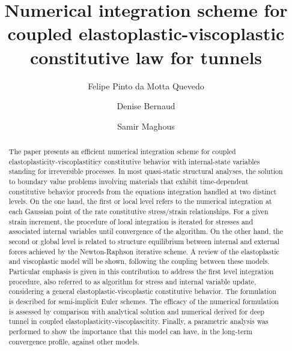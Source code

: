 \documentclass[Journal,letterpaper]{ascelike-new}
\begin{document}
\title{Numerical integration scheme for coupled elastoplastic-viscoplastic constitutive law for tunnels}

\author[1]{Felipe Pinto da Motta Quevedo}
\author[2]{Denise Bernaud}
\author[3]{Samir Maghous}


\maketitle

\begin{abstract}
The paper presents an efficient numerical integration scheme for coupled elastoplasticity-viscoplastiticy constitutive behavior with internal-state variables standing for irreversible processes. In most quasi-static structural analyses, the solution to boundary value problems involving materials that exhibit time-dependent constitutive behavior proceeds from the equations integration handled at two distinct levels. On the one hand, the first or local level refers to the numerical integration at each Gaussian point of the rate constitutive stress/strain relationships. For a given strain increment, the procedure of local integration is iterated for stresses and associated internal variables until convergence of the algorithm. On the other hand, the second or global level is related to structure equilibrium between internal and external forces achieved by the Newton-Raphson iterative scheme. A review of the elastoplastic and viscoplastic model will be shown, following the coupling between these models. Particular emphasis is given in this contribution to address the first level integration procedure, also referred to as algorithm for stress and internal variable update, considering a general elastoplastic-viscoplastic constitutive behavior. The formulation is described for semi-implicit Euler schemes. The efficacy of the numerical formulation is assessed by comparison with analytical solution and numerical derived for deep tunnel in coupled elastoplasticity-viscoplascitity. Finally, a parametric analysis was performed to show the importance that this model can have, in the long-term convergence profile, against other models.
\end{abstract}
\end{document}
